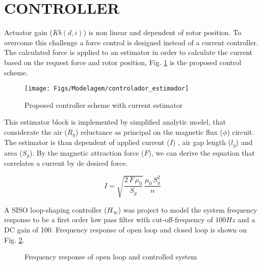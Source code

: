 \documentclass[10pt,fleqn,a4paper,twoside]{article}
\begin{document}
	\section{CONTROLLER}
	
	Actuator gain ($Kb(d,i)$) is non linear and dependent of rotor position. To overcome this challenge a force control is designed instead of a current controller. The calculated force is applied to an estimator in order to calculate the current based on the request force and rotor position, Fig. \ref{fig:diagrama_controlador_estimador} is the proposed control scheme.
	
	
	\begin{figure}[ht]
	\centering
	\texttt{[image: Figs/Modelagem/controlador\_estimador]}
	\caption{Proposed controller scheme with current estimator}
	\label{fig:diagrama_controlador_estimador}
	\end{figure}
	
	This estimator block is implemented by simplified analytic model, that considerate the  air ($R_g$) reluctance as principal on the magnetic flux ($\phi$) circuit. The estimator is than dependent of applied current ($I$) , air gap length ($l_g$) and area ($S_g$). By the magnetic attraction force ($F$), we can derive the equation that correlates a current by de desired force.

	\begin{equation}
		I = \sqrt{\frac{2 \, F \, \mu_0}{S_g}} \, \frac{\mu_0 \, S_g^2}{n}
	\end{equation}
	
	A SISO loop-shaping controller ($H_{\infty}$) was project to model the system frequency response to be a first order low pass filter with cut-off-frequency of $100 Hz$ and a DC gain of 100. Frequency response of open loop and closed loop  is shown on Fig. \ref{fig:bode}.
	
	
	\begin{figure}[ht]
		\hfill
		\caption{Frequency response of open loop and controlled system}
		\label{fig:bode}
	\end{figure}	
	
\end{document}
